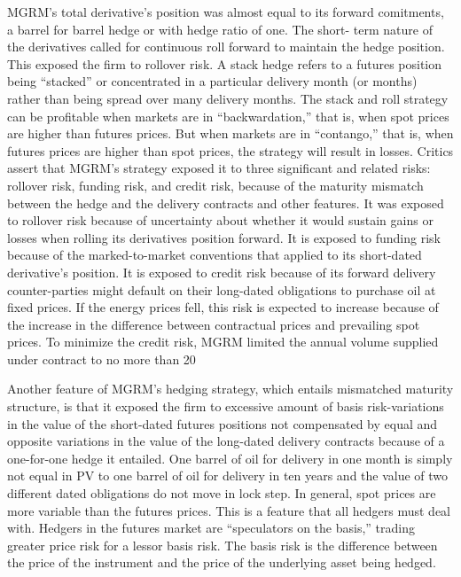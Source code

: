 MGRM’s total derivative’s position was almost equal to its forward comitments, a barrel for barrel hedge or with hedge ratio of one.  The short- term nature of the derivatives called for continuous roll forward to maintain the hedge position.  This exposed the firm to rollover risk.  A stack hedge refers to a futures position being “stacked” or concentrated in a particular delivery month (or months) rather than being spread over many delivery months.  The stack and roll strategy can be profitable when markets are in “backwardation,” that is, when spot prices are higher than futures prices.  But when markets are in “contango,” that is, when futures prices are higher than spot prices, the strategy will result in losses. Critics assert that MGRM’s strategy exposed it to three significant and related risks: rollover risk, funding risk, and credit risk, because of the maturity mismatch between the hedge and the delivery contracts and other features.  It was exposed to rollover risk because of uncertainty about whether it would sustain gains or losses when rolling its derivatives position forward.  It is exposed to funding risk because of the marked-to-market conventions that applied to its short-dated derivative’s position.  It is exposed to credit risk because of its forward delivery counter-parties might default on their long-dated obligations to purchase oil at fixed prices.  If the energy prices fell, this risk is expected to increase because of the increase in the difference between contractual prices and prevailing spot prices.   To minimize the credit risk, MGRM limited the annual volume supplied under contract to no more than 20%

Another feature of MGRM’s hedging strategy, which entails mismatched maturity structure, is that it exposed the firm to excessive amount of basis risk-variations in the value of
the short-dated futures positions not compensated by equal and opposite variations in the value of the long-dated delivery contracts because of  a one-for-one hedge it entailed.  One barrel of oil for delivery in one month is simply not equal in PV to one barrel of oil for delivery in ten years and the value of two different dated obligations do not move in lock step.  In general, spot prices are more variable than the futures prices.  This is a feature that all hedgers must deal with. Hedgers in the futures market are “speculators on the basis,” trading greater price risk for a lessor basis risk.  The basis risk is the difference between the price of the instrument and the price of the underlying asset being hedged.

